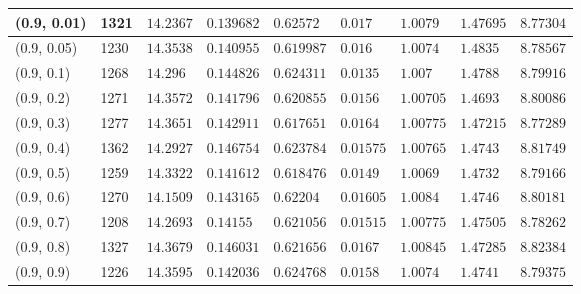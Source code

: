 \begin{center}
{\begin{longtable}{| l | p{} |  p{} | p{} | p{} | p{} | p{} | p{} | p{} |}
 (0.9, 0.01) & 1321  & $14.2367$ & $0.139682$ & $0.62572$ & $0.017$ & $1.0079$ & $1.47695$ & $8.77304$ \\ \hline
 (0.9, 0.05) & 1230  & $14.3538$ & $0.140955$ & $0.619987$ & $0.016$ & $1.0074$ & $1.4835$ & $8.78567$ \\ \hline
 (0.9, 0.1) & 1268  & $14.296$ & $0.144826$ & $0.624311$ & $0.0135$ & $1.007$ & $1.4788$ & $8.79916$ \\ \hline
 (0.9, 0.2) & 1271  & $14.3572$ & $0.141796$ & $0.620855$ & $0.0156$ & $1.00705$ & $1.4693$ & $8.80086$ \\ \hline
 (0.9, 0.3) & 1277  & $14.3651$ & $0.142911$ & $0.617651$ & $0.0164$ & $1.00775$ & $1.47215$ & $8.77289$ \\ \hline
 (0.9, 0.4) & 1362  & $14.2927$ & $0.146754$ & $0.623784$ & $0.01575$ & $1.00765$ & $1.4743$ & $8.81749$ \\ \hline
 (0.9, 0.5) & 1259  & $14.3322$ & $0.141612$ & $0.618476$ & $0.0149$ & $1.0069$ & $1.4732$ & $8.79166$ \\ \hline
 (0.9, 0.6) & 1270  & $14.1509$ & $0.143165$ & $0.62204$ & $0.01605$ & $1.0084$ & $1.4746$ & $8.80181$ \\ \hline
 (0.9, 0.7) & 1208  & $14.2693$ & $0.14155$ & $0.621056$ & $0.01515$ & $1.00775$ & $1.47505$ & $8.78262$ \\ \hline
 (0.9, 0.8) & 1327  & $14.3679$ & $0.146031$ & $0.621656$ & $0.0167$ & $1.00845$ & $1.47285$ & $8.82384$ \\ \hline
 (0.9, 0.9) & 1226  & $14.3595$ & $0.142036$ & $0.624768$ & $0.0158$ & $1.0074$ & $1.4741$ & $8.79375$ \\ \hline
\end{longtable}

}
\end{center}
